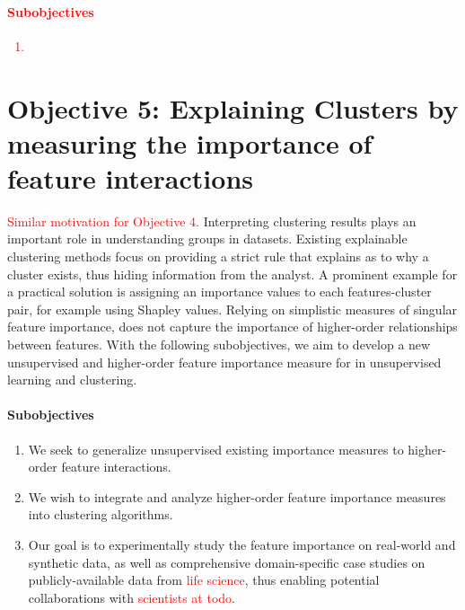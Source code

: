 \documentclass[10pt,a4paper]{article}
\newcommand\note[1]{\textcolor{red}{#1}}
\begin{document}
\note{\paragraph{Subobjectives} 
\begin{enumerate}
	\item 
\end{enumerate}}

\section{Objective 5: Explaining Clusters by measuring the importance of feature interactions}
\note{Similar motivation for Objective 4.}
Interpreting clustering results plays an important role in understanding groups in datasets. 
Existing explainable clustering methods focus on providing a strict rule that explains as to why a cluster exists, thus hiding information from the analyst.
A prominent example for a practical solution is assigning an importance values to each features-cluster pair, for example using Shapley values. 
Relying on simplistic measures of singular feature importance, does not capture the importance of higher-order relationships between features. 
With the following subobjectives, we aim to develop a new unsupervised and higher-order feature importance measure for in unsupervised learning and clustering.

\paragraph{Subobjectives} 
\begin{enumerate}
	\item We seek to generalize unsupervised existing importance measures to higher-order feature interactions.
   \item We wish to integrate and analyze higher-order feature importance measures into clustering algorithms. 
   \item Our goal is to experimentally study the feature importance on real-world and synthetic data, as well as comprehensive domain-specific case studies on publicly-available data from \note{life science}, thus enabling potential collaborations with \note{scientists at todo}.
\end{enumerate}
\end{document}
